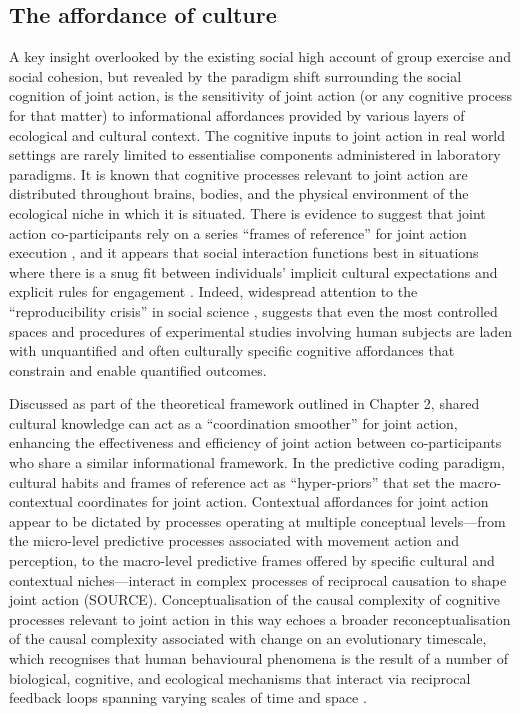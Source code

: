 \subsection{The affordance of culture}
A key insight overlooked by the existing social high account of group exercise and social cohesion, but revealed by the paradigm shift surrounding the social cognition of joint action, is the sensitivity of joint action (or any cognitive process for that matter) to informational affordances provided by various layers of ecological and cultural context.  The cognitive inputs to joint action in real world settings are rarely limited to essentialise components administered in laboratory paradigms. It is known that cognitive processes relevant to joint action are distributed throughout brains, bodies, and the physical environment of the ecological niche in which it is situated.  There is evidence to suggest that joint action co-participants rely on a series ``frames of reference'' for joint action execution \citep{Ray2018}, and it appears that social interaction functions best in situations where there is a snug fit between individuals' implicit cultural expectations and explicit rules for engagement \citep{Vollan2017}.  Indeed, widespread attention to the ``reproducibility crisis'' in social science \citep{Earp2015,Rathmacher2017}, suggests that even the most controlled spaces and procedures of experimental studies involving human subjects are laden with unquantified and often culturally specific cognitive affordances that constrain and enable quantified outcomes.

Discussed as part of the theoretical framework outlined in Chapter 2, shared cultural knowledge can act as a ``coordination smoother'' \citep{Vesper2017} for joint action, enhancing the effectiveness and efficiency of joint action between co-participants who share a similar informational framework.  In the predictive coding paradigm, cultural habits and frames of reference act as ``hyper-priors'' that set the macro-contextual coordinates for joint action\citep{Clark2013}.  Contextual affordances for joint action appear to be dictated by processes operating at multiple conceptual levels---from the micro-level predictive processes associated with movement action and perception, to the macro-level predictive frames offered by specific cultural and contextual niches---interact in complex processes of reciprocal causation to shape joint action (SOURCE).  Conceptualisation of the causal complexity of cognitive processes relevant to joint action in this way echoes a broader reconceptualisation of the causal complexity associated with change on an evolutionary timescale, which recognises that human behavioural phenomena is the result of a number of biological, cognitive, and ecological mechanisms that interact via reciprocal feedback loops spanning varying scales of time and space \citep{Fuentes2015}.

